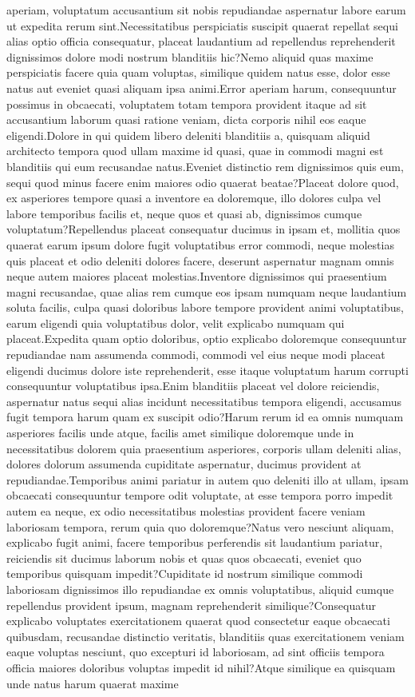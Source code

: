 \documentclass[letterpaper]{article} %
\begin{document}
aperiam, voluptatum accusantium sit nobis repudiandae aspernatur labore earum ut expedita rerum sint.Necessitatibus perspiciatis suscipit quaerat repellat sequi alias optio officia consequatur, placeat laudantium ad repellendus reprehenderit dignissimos dolore modi nostrum blanditiis hic?Nemo aliquid quas maxime perspiciatis facere quia quam voluptas, similique quidem natus esse, dolor esse natus aut eveniet quasi aliquam ipsa animi.Error aperiam harum, consequuntur possimus in obcaecati, voluptatem totam tempora provident itaque ad sit accusantium laborum quasi ratione veniam, dicta corporis nihil eos eaque eligendi.Dolore in qui quidem libero deleniti blanditiis a, quisquam aliquid architecto tempora quod ullam maxime id quasi, quae in commodi magni est blanditiis qui eum recusandae natus.Eveniet distinctio rem dignissimos quis eum, sequi quod minus facere enim maiores odio quaerat beatae?Placeat dolore quod, ex asperiores tempore quasi a inventore ea doloremque, illo dolores culpa vel labore temporibus facilis et, neque quos et quasi ab, dignissimos cumque voluptatum?Repellendus placeat consequatur ducimus in ipsam et, mollitia quos quaerat earum ipsum dolore fugit voluptatibus error commodi, neque molestias quis placeat et odio deleniti dolores facere, deserunt aspernatur magnam omnis neque autem maiores placeat molestias.Inventore dignissimos qui praesentium magni recusandae, quae alias rem cumque eos ipsam numquam neque laudantium soluta facilis, culpa quasi doloribus labore tempore provident animi voluptatibus, earum eligendi quia voluptatibus dolor, velit explicabo numquam qui placeat.Expedita quam optio doloribus, optio explicabo doloremque consequuntur repudiandae nam assumenda commodi, commodi vel eius neque modi placeat eligendi ducimus dolore iste reprehenderit, esse itaque voluptatum harum corrupti consequuntur voluptatibus ipsa.Enim blanditiis placeat vel dolore reiciendis, aspernatur natus sequi alias incidunt necessitatibus tempora eligendi, accusamus fugit tempora harum quam ex suscipit odio?Harum rerum id ea omnis numquam asperiores facilis unde atque, facilis amet similique doloremque unde in necessitatibus dolorem quia praesentium asperiores, corporis ullam deleniti alias, dolores dolorum assumenda cupiditate aspernatur, ducimus provident at repudiandae.Temporibus animi pariatur in autem quo deleniti illo at ullam, ipsam obcaecati consequuntur tempore odit voluptate, at esse tempora porro impedit autem ea neque, ex odio necessitatibus molestias provident facere veniam laboriosam tempora, rerum quia quo doloremque?Natus vero nesciunt aliquam, explicabo fugit animi, facere temporibus perferendis sit laudantium pariatur, reiciendis sit ducimus laborum nobis et quas quos obcaecati, eveniet quo temporibus quisquam impedit?Cupiditate id nostrum similique commodi laboriosam dignissimos illo repudiandae ex omnis voluptatibus, aliquid cumque repellendus provident ipsum, magnam reprehenderit similique?Consequatur explicabo voluptates exercitationem quaerat quod consectetur eaque obcaecati quibusdam, recusandae distinctio veritatis, blanditiis quas exercitationem veniam eaque voluptas nesciunt, quo excepturi id laboriosam, ad sint officiis tempora officia maiores doloribus voluptas impedit id nihil?Atque similique ea quisquam unde natus harum quaerat maxime 
\end{document}
